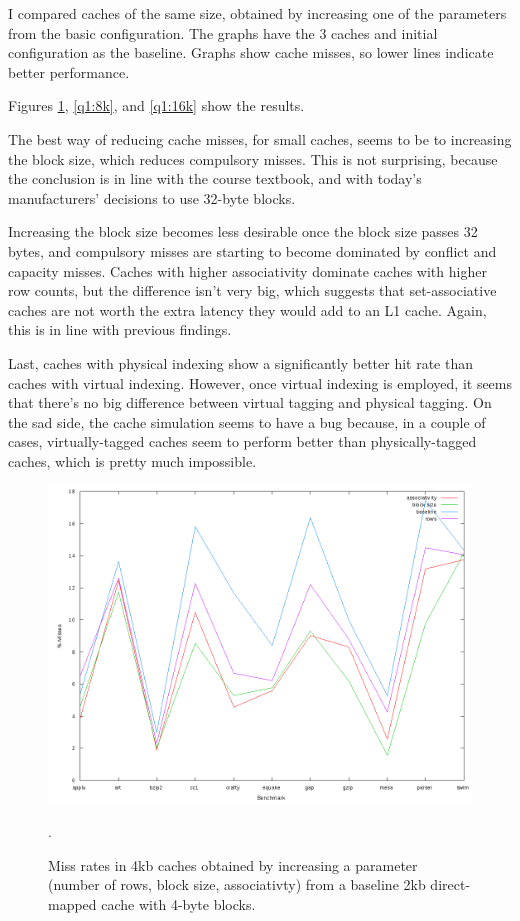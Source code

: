 I compared caches of the same size, obtained by increasing one of the
parameters from the basic configuration. The graphs have the 3 caches and
initial configuration as the baseline. Graphs show cache misses, so lower lines
indicate better performance.

Figures \ref{q1:4k}, \ref{q1:8k}, and \ref{q1:16k} show the results.

The best way of reducing cache misses, for small caches, seems to be to
increasing the block size, which reduces compulsory misses. This is not
surprising, because the conclusion is in line with the course textbook, and
with today's manufacturers' decisions to use 32-byte blocks.

Increasing the block size becomes less desirable once the block size passes 32
bytes, and compulsory misses are starting to become dominated by conflict and
capacity misses. Caches with higher associativity dominate caches with higher
row counts, but the difference isn't very big, which suggests that
set-associative caches are not worth the extra latency they would add to an L1
cache. Again, this is in line with previous findings.

Last, caches with physical indexing show a significantly better hit rate than
caches with virtual indexing. However, once virtual indexing is employed, it
seems that there's no big difference between virtual tagging and physical
tagging. On the sad side, the cache simulation seems to have a bug because, in a
couple of cases, virtually-tagged caches seem to perform better than
physically-tagged caches, which is pretty much impossible.

\begin{figure}[htb]
  \includegraphics[width=6.8in]{6.823/lab2/figs/ccc_4k.png}
  \caption{Miss rates in 4kb caches obtained by increasing a parameter
  (number of rows, block size, associativty) from a baseline 2kb direct-mapped
  cache with 4-byte blocks.} \label{q1:4k}.
\end{figure}


